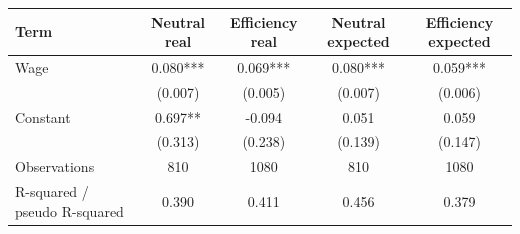 \begin{tabular}{lcccc}
\hline
Term & Neutral real & Efficiency real & Neutral expected & Efficiency expected \\
\hline
Wage & 0.080*** & 0.069*** & 0.080*** & 0.059*** \\
 & (0.007) & (0.005) & (0.007) & (0.006) \\
Constant & 0.697** & -0.094 & 0.051 & 0.059 \\
 & (0.313) & (0.238) & (0.139) & (0.147) \\
Observations & 810 & 1080 & 810 & 1080 \\
R-squared / pseudo R-squared & 0.390 & 0.411 & 0.456 & 0.379 \\
\hline
\end{tabular}

